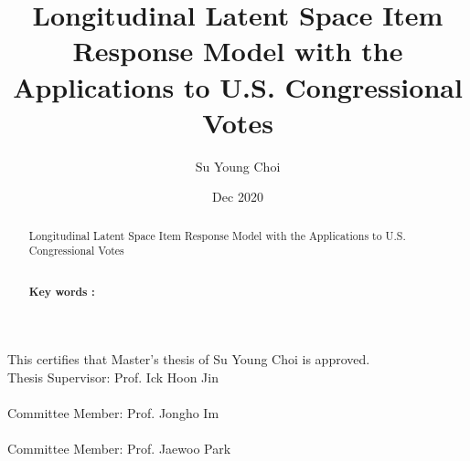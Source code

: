 \documentclass[a4paper, 11pt]{report}
\title{Longitudinal Latent Space Item Response Model with the Applications to U.S. Congressional Votes}
\author{Su Young Choi}
\date{Dec 2020}
\begin{document}
	
\maketitle \pagestyle{plain}

\newpage
\thispagestyle{empty}

  \null
  \begin{center}
    \vskip -1.4cm
    {\fontsize{14pt}{14pt}\selectfont This certifies that Master's thesis of Su Young Choi is approved.}
    \vskip 4cm%
    {\hskip 5cm\fontsize{12pt}{12pt}\selectfont \underline{\hskip 8cm}}\vspace*{0.2cm}\\
    \hskip 5cm\fontsize{12pt}{12pt}\selectfont Thesis Supervisor: Prof. Ick Hoon Jin\\
    \vskip 2cm
    {\hskip 5cm\fontsize{12pt}{12pt}\selectfont \underline{\hskip 8cm}}\vspace*{0.2cm}\\
    \hskip 5cm\fontsize{12pt}{12pt}\selectfont Committee Member: Prof. Jongho Im\\
    \vskip 2cm
    {\hskip 5cm\fontsize{12pt}{12pt}\selectfont \underline{\hskip 8cm}}\vspace*{0.2cm}\\
    \hskip 5cm\fontsize{12pt}{12pt}\selectfont Committee Member: Prof. Jaewoo Park\\
    \vskip 3cm%
    {\fontsize{14pt}{14pt}\selectfont {The Graduate School \vskip 1.0em Yonsei University \vskip 1.0em Dec 2020}}%
  \end{center}
  \par
\clearpage

\pagestyle{plain}

\clearpage {} \tableofcontents \clearpage

\clearpage {}
\listoffigures

\clearpage {}
\listoftables

\clearpage {}


\begin{abstract}
\begin{center}
{\LARGE Longitudinal Latent Space Item Response Model  with the Applications to U.S. Congressional Votes}
\end{center}
\indent
\vskip 0.8cm

\noindent

\vskip 0.2cm

 \noindent
\hrulefill\\
{\bf Key words : }
\parbox[t]{0.8\textwidth}
{}
\end{abstract}
\end{document}
